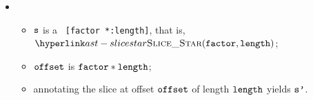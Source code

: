 \begin{itemize}
  \item {}
  \begin{itemize}
    \item $\vs$ is a \scaledslice\ \texttt{[factor *:length]}, that is, \\
          $\SliceStar(\factor, \length)$;
    \item $\offset$ is $\factor * \length$;
    \item annotating the slice at offset $\offset$ of length $\length$ yields $\vsp$\ProseOrTypeError.
  \end{itemize}
\end{itemize}

\FormallyParagraph
\begin{mathpar}
\end{mathpar}

\begin{mathpar}
\end{mathpar}

\begin{mathpar}
\end{mathpar}

